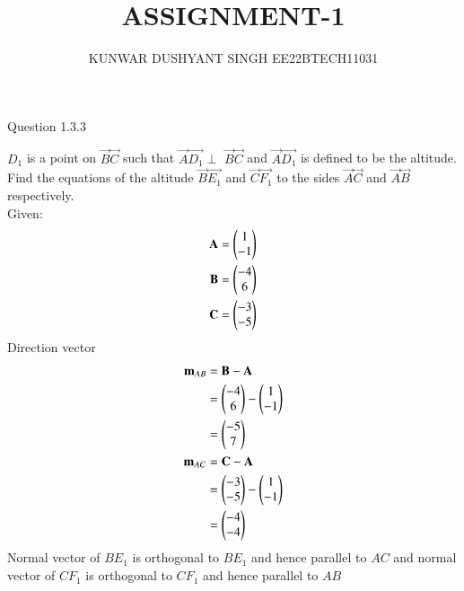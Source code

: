 \documentclass[journal,12pt,twocolumn]{IEEEtran}
\theoremstyle{remark}
\begin{document}



\vspace{3cm}

\title{
ASSIGNMENT-1
}
\author{ KUNWAR DUSHYANT SINGH EE22BTECH11031}


\maketitle

\newpage


\bigskip

\renewcommand{\thefigure}{\theenumi}
\renewcommand{\thetable}{\theenumi}

Question 1.3.3 

$D_{1}$ is a point on $\vec{B}$$\vec{C}$ such that
$\vec{A}$$\vec{D_{1}}$$\perp$ $\vec{B}$$\vec{C}$ and $\vec{A}$$\vec{D_{1}}$  is defined to be the altitude.
Find the equations of the altitude $\vec{B}$$\vec{E_{1}}$ and $\vec{C}$$\vec{F_{1}}$
to the sides $\vec{A}$$\vec{C}$ and $\vec{A}$$\vec{B}$ respectively.
\\ \solution
Given:
\begin{align}\mathbf{A}=\begin{pmatrix}1\\-1\end{pmatrix} \\
\mathbf{B}=\begin{pmatrix}-4 \\6\end{pmatrix} \\
\mathbf{C}=\begin{pmatrix}-3\\-5\end{pmatrix}
\end{align}
Direction vector 
\begin{align}
\mathbf{m}_{AB}&=\mathbf{B}-\mathbf{A} \\
&=\begin{pmatrix}-4\\6\end{pmatrix}-\begin{pmatrix}1\\-1\end{pmatrix} \\
&=\begin{pmatrix}-5\\7\end{pmatrix} \\
\mathbf{m}_{AC}&=\mathbf{C}-\mathbf{A} \\
&=\begin{pmatrix}-3\\-5\\\end{pmatrix}-\begin{pmatrix}1\\-1\end{pmatrix} \\
&=\begin{pmatrix}-4\\-4\\\end{pmatrix}
\end{align}
Normal vector of $BE_{1}$ is orthogonal to $BE_{1}$ and hence parallel to $AC$ and normal vector of $CF_{1}$ is orthogonal to $CF_{1}$ and hence parallel to $AB$ 
\begin{align}

\end{align}$$
\end{document}
